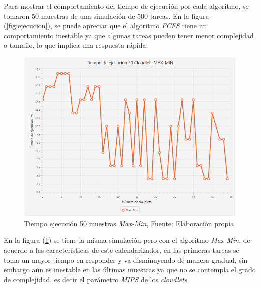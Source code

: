 Para mostrar el comportamiento del tiempo de ejecuci\'on por cada algoritmo, se tomaron 50 muestras de una simulaci\'on de 500 tareas. En la figura (\ref{fig:ejecucion}), se puede apreciar que el algoritmo \textit{FCFS} tiene un comportamiento inestable ya que algunas tareas pueden tener menor complejidad o tamaño, lo que implica una respuesta r\'apida.

\newpage

\setcounter{figure}{17}
\renewcommand\thefigure{\arabic{figure}}
\begin{figure}[h!] 
	\centering
	\includegraphics[scale=0.5]{media/max-min}
	\caption{Tiempo ejecuci\'on 50 muestras \textit{Max-Min}, Fuente: Elaboraci\'on propia}
	\label{fig:maxmin}
\end{figure}


 En la figura (\ref{fig:maxmin}) se tiene la misma simulaci\'on pero con el algoritmo \textit{Max-Min}, de acuerdo a las caracter\'isticas de este calendarizador, en las primeras tareas se toma un mayor tiempo en responder y va disminuyendo de manera gradual, sin embargo a\'un es inestable en las \'ultimas muestras ya que no se contempla el grado de complejidad, es decir el par\'ametro \textit{MIPS} de los \textit{cloudlets}.



